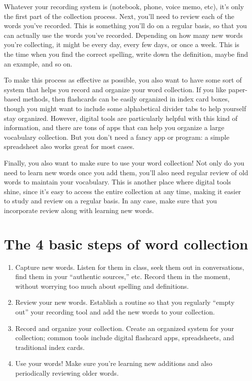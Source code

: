 \documentclass[../main.tex]{subfiles}
\begin{document}
Whatever your recording system is (notebook, phone, voice memo, etc), it’s only
the first part of the collection process. Next, you’ll need to review each of
the words you’ve recorded. This is something you’ll do on a regular basis, so
that you can actually use the words you’ve recorded. Depending on how many new
words you’re collecting, it might be every day, every few days, or once a week.
This is the time when you find the correct spelling, write down the definition,
maybe find an example, and so on.

To make this process as effective as possible, you also want to have some sort
of system that helps you record and organize your word collection. If you like
paper-based methods, then flashcards can be easily organized in index card
boxes, though you might want to include some alphabetical divider tabs to help
yourself stay organized. However, digital tools are particularly helpful with
this kind of information, and there are tons of apps that can help you organize
a large vocabulary collection. But you don’t need a fancy app or program: a
simple spreadsheet also works great for most cases.

Finally, you also want to make sure to use your word collection! Not only do you
need to learn new words once you add them, you’ll also need regular review of
old words to maintain your vocabulary. This is another place where digital tools
shine, since it’s easy to access the entire collection at any time, making it
easier to study and review on a regular basis. In any case, make sure that you
incorporate review along with learning new words.
%
\section{The 4 basic steps of word collection}
\begin{enumerate}
  \item Capture new words. Listen for them in class, seek them out in
    conversations, find them in your “authentic sources,” etc. Record them in
    the moment, without worrying too much about spelling and definitions.
  \item Review your new words. Establish a routine so that you regularly “empty
    out” your recording tool and add the new words to your collection.
  \item Record and organize your collection. Create an organized system for your
    collection; common tools include digital flashcard apps, spreadsheets, and
    traditional index cards.
  \item Use your words! Make sure you’re learning new additions and also
    periodically reviewing older words.
\end{enumerate}
%
\end{document}
